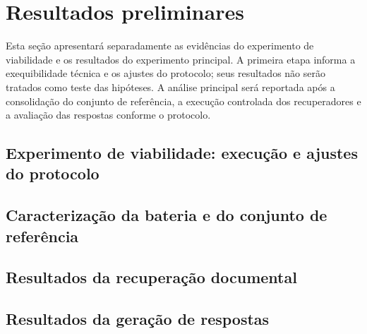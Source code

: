 \section{Resultados preliminares}
\label{sec:resultados}

Esta seção apresentará separadamente as evidências do experimento de viabilidade e os resultados do experimento principal. A primeira etapa informa a exequibilidade técnica e os ajustes do protocolo; seus resultados não serão tratados como teste das hipóteses. A análise principal será reportada após a consolidação do conjunto de referência, a execução controlada dos recuperadores e a avaliação das respostas conforme o protocolo.

\subsection{Experimento de viabilidade: execução e ajustes do protocolo}


\subsection{Caracterização da bateria e do conjunto de referência}


\subsection{Resultados da recuperação documental}


\subsection{Resultados da geração de respostas}


